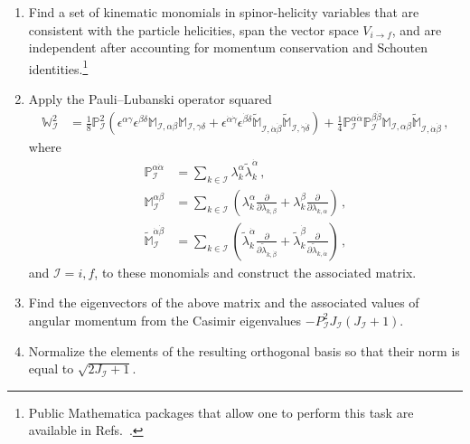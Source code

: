 \begin{enumerate}
    \item Find a set of kinematic monomials in spinor-helicity variables that are consistent with the particle helicities, span the vector space $V_{i\to f}$, and are independent after accounting for momentum conservation and Schouten identities.\footnote{Public Mathematica packages that allow one to perform this task are available in Refs.~\cite{DeAngelis:2022qco,Li:2022tec}.}
    \item Apply the Pauli--Lubanski operator squared~\cite{Witten:2003nn}
    \begin{align}
    \mathbb W^2_{\mathcal I} &= \frac{1}{8}\mathbb P_{\mathcal I}^2 \left(\epsilon^{\alpha\gamma}\epsilon^{\beta\delta}\mathbb M_{\mathcal I,\alpha\beta}\mathbb M_{\mathcal I,\gamma\delta}+\epsilon^{\dot\alpha\dot\gamma}\epsilon^{\dot\beta\dot\delta}\widetilde{\mathbb M}_{\mathcal I,\dot\alpha\dot\beta}\widetilde{\mathbb M}_{\mathcal I,\dot\gamma\dot\delta}\right)
    +\frac{1}{4}\mathbb P_{\mathcal I}^{\alpha\dot\alpha}\mathbb P_{\mathcal I}^{\beta\dot\beta}\mathbb M_{\mathcal I,\alpha\beta}\widetilde{\mathbb M}_{\mathcal I,\dot\alpha\dot\beta}\,,
    \label{eq:PLoperator}
\end{align}
where
\begin{align}
    \mathbb P_{\mathcal I}^{\alpha\dot\alpha} &= \sum_{k\in \mathcal I}\lambda_k^\alpha \widetilde \lambda_k^{\dot\alpha}\,,\\
    \mathbb M_{\mathcal I}^{\alpha\beta} &= \sum_{k\in \mathcal I}\left(\lambda_{k}^\alpha\frac{\partial}{\partial \lambda_{k,\beta}}+\lambda_{k}^\beta \frac{\partial}{\partial \lambda_{k,\alpha}}\right)\,,\\
    \widetilde{\mathbb M}_{\mathcal I}^{\dot\alpha\dot\beta} &= \sum_{k\in \mathcal I}\left(\widetilde\lambda_{k}^{\dot\alpha}\frac{\partial}{\partial \widetilde\lambda_{k,\dot\beta}}+\widetilde\lambda_{k}^{\dot\beta}\frac{\partial}{\partial \widetilde\lambda_{k,\dot\alpha}}\right)\,,
\end{align}
and $\mathcal I=i,f$,
to these monomials and construct the associated matrix.
%
\item Find the eigenvectors of the above matrix and the associated values of angular momentum from the Casimir eigenvalues $-P^2_{\mathcal I}J_{\mathcal I}(J_{\mathcal I}+1)$.
\item Normalize the elements of the resulting orthogonal basis so that their norm is equal to $\sqrt{2J_{\mathcal I}+1}$.
\end{enumerate}


